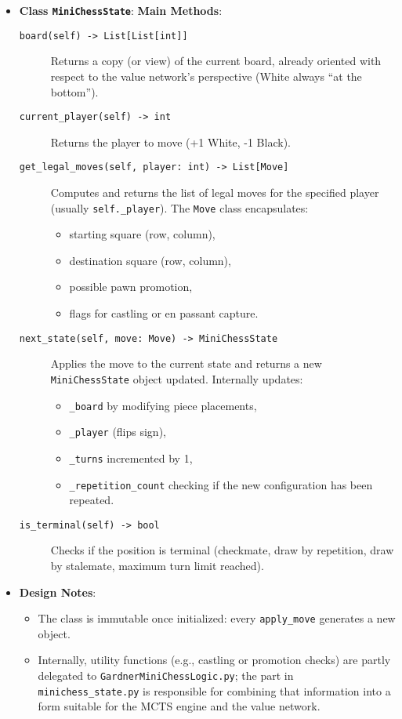 \documentclass{report}
\begin{document}
\begin{itemize}
  \item \textbf{Class \texttt{MiniChessState}}:
     \textbf{Main Methods}:
        \begin{description}
          \item[\texttt{board(self) -> List[List[int]]}] Returns a copy (or view) of the current board, already oriented with respect to the value network’s perspective (White always “at the bottom”).  
          \item[\texttt{current\_player(self) -> int}] Returns the player to move (+1 White, -1 Black).
          \item[\texttt{get\_legal\_moves(self, player: int) -> List[Move]}]  
            Computes and returns the list of legal moves for the specified player (usually \texttt{self.\_player}). The \texttt{Move} class encapsulates:
            \begin{itemize}
              \item starting square (row, column),
              \item destination square (row, column),
              \item possible pawn promotion,
              \item flags for castling or en passant capture.
            \end{itemize}
          \item[\texttt{next\_state(self, move: Move) -> MiniChessState}]  
            Applies the move to the current state and returns a new \texttt{MiniChessState} object updated. Internally updates:
            \begin{itemize}
              \item \texttt{\_board} by modifying piece placements,
              \item \texttt{\_player} (flips sign),
              \item \texttt{\_turns} incremented by 1,
              \item \texttt{\_repetition\_count} checking if the new configuration has been repeated.
            \end{itemize}
          \item[\texttt{is\_terminal(self) -> bool}]  
            Checks if the position is terminal (checkmate, draw by repetition, draw by stalemate, maximum turn limit reached). 
        \end{description}
      \item \textbf{Design Notes}:
        \begin{itemize}
          \item The class is immutable once initialized: every \texttt{apply\_move} generates a new object.
          \item Internally, utility functions (e.g., castling or promotion checks) are partly delegated to \texttt{GardnerMiniChessLogic.py}; the part in \texttt{minichess\_state.py} is responsible for combining that information into a form suitable for the MCTS engine and the value network.
        \end{itemize}
    \end{itemize}
\end{document}
